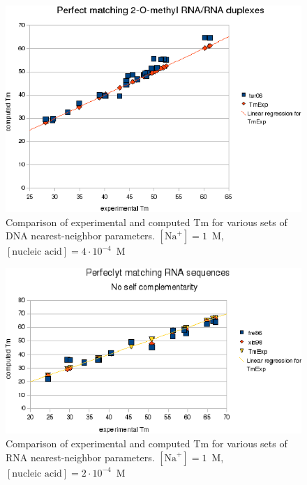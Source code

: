\documentclass{article}
\begin{document}
\begin{figure}[h]
\includegraphics[width=1\linewidth]{images/DNAPerfectlyMatching}
\caption{Comparison of experimental and computed Tm for various sets of
  DNA nearest-neighbor parameters. $[\mbox{Na}^+] = 1$~M, $[\mbox{nucleic acid}] = 4\cdot{}10^{-4}$~M}
\end{figure}

\begin{figure}[h!]
\includegraphics[width=1\linewidth]{images/RNAPerfectlyMatching}
\caption{Comparison of experimental and computed Tm for various sets of
  RNA nearest-neighbor parameters. $[\mbox{Na}^+] = 1$~M, $[\mbox{nucleic acid}] = 2\cdot{}10^{-4}$~M}
\end{figure}
\end{document}
